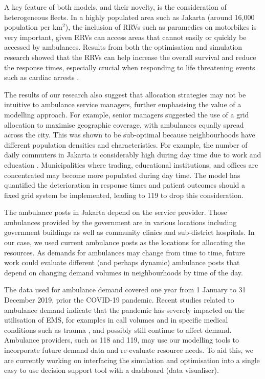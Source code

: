 \documentclass[preprint,12pt]{elsarticle}
\begin{document}
A key feature of both models, and their novelty, is the consideration of
heterogeneous fleets. In a highly populated area such as Jakarta (around 16,000
population per km$^2$), the inclusion of RRVs such as paramedics on motorbikes
is very important, given RRVs can access areas that cannot easily or quickly be
accessed by ambulances. Results from both the optimisation and simulation
research showed that the RRVs can help increase the overall survival and reduce
the response times, especially crucial when responding to life threatening
events such as cardiac arrests \cite{holmen2020shortening}. 

The results of our research also suggest that allocation strategies may not be
intuitive to ambulance service managers, further emphasising the value of a
modelling approach. For example, senior managers suggested the use of a grid
allocation to maximise geographic coverage, with ambulances equally spread
across the city. This was shown to be sub-optimal because neighbourhoods have
different population densities and characteristics. For example, the number of
daily commuters in Jakarta is considerably high during day time due to work and
education \cite{BPS_Jakarta_migrasi}. Municipalities where trading, educational
institutions, and offices are concentrated may become more populated during day
time. The model has quantified the deterioration in response times and patient
outcomes should a fixed grid system be implemented, leading to 119 to drop this
consideration.

The ambulance posts in Jakarta depend on the service provider. Those ambulances
provided by the government are in various locations including government
buildings as well as community clinics and sub-district hospitals. In our case,
we used current ambulance posts as the locations for allocating the resources.
As demands for ambulances may change from time to time, future work could
evaluate different (and perhaps dynamic) ambulance posts that depend on changing
demand volumes in neighbourhoods by time of the day.

The data used for ambulance demand covered one year from 1 January to 31
December 2019, prior the COVID-19 pandemic. Recent studies related to ambulance
demand indicate that the  pandemic has severely impacted on the utilisation of
EMS, for examples in call volumes \cite{csan2021effects} and in specific medical
conditions such as trauma \cite{ azbel2021effects}, and possibly still continue
to affect demand. Ambulance providers, such as 118 and 119, may use our
modelling tools to incorporate future demand data and re-evaluate resource
needs. To aid this, we are currently working on interfacing the simulation and
optimisation into a single easy to use decision support tool with a dashboard
(data visualiser). 
\end{document}
